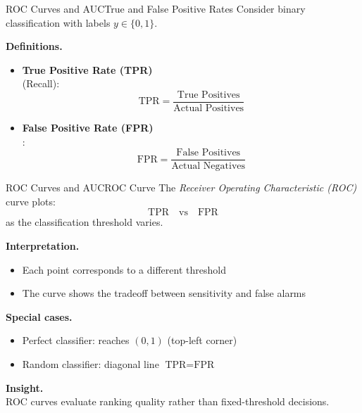 \documentclass[aspectratio=169,11pt]{beamer}
\begin{document}
\begin{frame}[t,allowframebreaks]{ROC Curves and AUC}{True and False Positive Rates}
\small
Consider binary classification with labels $y \in \{0,1\}$.

\textbf{Definitions.}\\ \begin{itemize}
    \item \textbf{True Positive Rate (TPR)}\\ (Recall):
    \[
    \text{TPR} = \frac{\text{True Positives}}{\text{Actual Positives}}
    \]

    \item \textbf{False Positive Rate (FPR)}\\ :
    \[
    \text{FPR} = \frac{\text{False Positives}}{\text{Actual Negatives}}
    \]
\end{itemize}
\end{frame}

\begin{frame}[t,allowframebreaks]{ROC Curves and AUC}{ROC Curve}
\small
The \emph{Receiver Operating Characteristic (ROC)} curve plots:
\[
\text{TPR} \quad \text{vs} \quad \text{FPR}
\]
as the classification threshold varies.

\textbf{Interpretation.}\\ \begin{itemize}
    \item Each point corresponds to a different threshold
    \item The curve shows the tradeoff between sensitivity and false alarms
\end{itemize}

\textbf{Special cases.}\\ \begin{itemize}
    \item Perfect classifier: reaches $(0,1)$ (top-left corner)
    \item Random classifier: diagonal line $\text{TPR} = \text{FPR}$
\end{itemize}

\textbf{Insight.}\\ ROC curves evaluate ranking quality rather than fixed-threshold decisions.
\end{frame}
\end{document}
